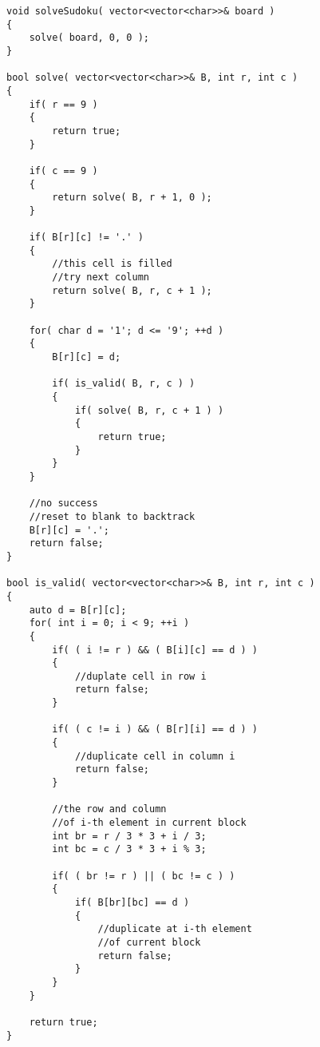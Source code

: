 \setcounter{lstlisting}{0}
\begin{lstlisting}[style=customc, caption={Backtrack}]
void solveSudoku( vector<vector<char>>& board )
{
    solve( board, 0, 0 );
}

bool solve( vector<vector<char>>& B, int r, int c )
{
    if( r == 9 )
    {
        return true;
    }

    if( c == 9 )
    {
        return solve( B, r + 1, 0 );
    }

    if( B[r][c] != '.' )
    {
        //this cell is filled
        //try next column
        return solve( B, r, c + 1 );
    }

    for( char d = '1'; d <= '9'; ++d )
    {
        B[r][c] = d;

        if( is_valid( B, r, c ) )
        {
            if( solve( B, r, c + 1 ) )
            {
                return true;
            }
        }
    }

    //no success
    //reset to blank to backtrack
    B[r][c] = '.';
    return false;
}

bool is_valid( vector<vector<char>>& B, int r, int c )
{
    auto d = B[r][c];
    for( int i = 0; i < 9; ++i )
    {
        if( ( i != r ) && ( B[i][c] == d ) )
        {
            //duplate cell in row i
            return false;
        }

        if( ( c != i ) && ( B[r][i] == d ) )
        {
            //duplicate cell in column i
            return false;
        }

        //the row and column
        //of i-th element in current block
        int br = r / 3 * 3 + i / 3;
        int bc = c / 3 * 3 + i % 3;

        if( ( br != r ) || ( bc != c ) )
        {
            if( B[br][bc] == d )
            {
                //duplicate at i-th element
                //of current block
                return false;
            }
        }
    }

    return true;
}
\end{lstlisting}